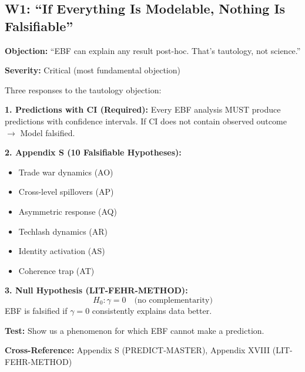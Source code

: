 \subsection{W1: ``If Everything Is Modelable, Nothing Is Falsifiable''}
\label{sec:da-w1}

\begin{tcolorbox}[colback=gray!5!white, colframe=gray!75!black]
\textbf{Objection:} ``EBF can explain any result post-hoc. That's tautology, not science.''

\textbf{Severity:} Critical (most fundamental objection)
\end{tcolorbox}

\begin{axiom}
Three responses to the tautology objection:

\textbf{1. Predictions with CI (Required):}
Every EBF analysis MUST produce predictions with confidence intervals.
If CI does not contain observed outcome $\rightarrow$ Model falsified.

\textbf{2. Appendix S (10 Falsifiable Hypotheses):}
\begin{itemize}[nosep]
    \item Trade war dynamics (AO)
    \item Cross-level spillovers (AP)
    \item Asymmetric response (AQ)
    \item Techlash dynamics (AR)
    \item Identity activation (AS)
    \item Coherence trap (AT)
\end{itemize}

\textbf{3. Null Hypothesis (LIT-FEHR-METHOD):}
\begin{equation}
H_0: \gamma = 0 \quad \text{(no complementarity)}
\end{equation}
EBF is falsified if $\gamma = 0$ consistently explains data better.

\textbf{Test:} Show us a phenomenon for which EBF cannot make a prediction.
\end{axiom}

\textbf{Cross-Reference:} Appendix S (PREDICT-MASTER), Appendix XVIII (LIT-FEHR-METHOD)

